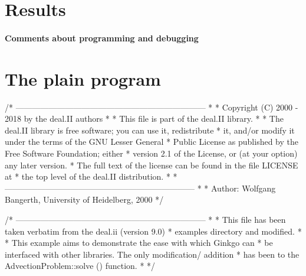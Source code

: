 \section*{Results}

\label{_Commentsaboutprogramminganddebugging}%
\paragraph*{Comments about programming and debugging }

\label{_PlainProg}%
 \section*{The plain program}


\begin{DoxyCodeInclude}
\textcolor{comment}{/* ---------------------------------------------------------------------}
\textcolor{comment}{ *}
\textcolor{comment}{ * Copyright (C) 2000 - 2018 by the deal.II authors}
\textcolor{comment}{ *}
\textcolor{comment}{ * This file is part of the deal.II library.}
\textcolor{comment}{ *}
\textcolor{comment}{ * The deal.II library is free software; you can use it, redistribute}
\textcolor{comment}{ * it, and/or modify it under the terms of the GNU Lesser General}
\textcolor{comment}{ * Public License as published by the Free Software Foundation; either}
\textcolor{comment}{ * version 2.1 of the License, or (at your option) any later version.}
\textcolor{comment}{ * The full text of the license can be found in the file LICENSE at}
\textcolor{comment}{ * the top level of the deal.II distribution.}
\textcolor{comment}{ *}
\textcolor{comment}{ * ---------------------------------------------------------------------}
\textcolor{comment}{}
\textcolor{comment}{ *}
\textcolor{comment}{ * Author: Wolfgang Bangerth, University of Heidelberg, 2000}
\textcolor{comment}{ */}

\textcolor{comment}{/* ---------------------------------------------------------------------}
\textcolor{comment}{ *}
\textcolor{comment}{ * This file has been taken verbatim from the deal.ii (version 9.0)}
\textcolor{comment}{ * examples directory and modified.}
\textcolor{comment}{ *}
\textcolor{comment}{ * This example aims to demonstrate the ease with which Ginkgo can}
\textcolor{comment}{ * be interfaced with other libraries. The only modification/ addition}
\textcolor{comment}{ * has been to the AdvectionProblem::solve () function.}
\textcolor{comment}{ *}
\textcolor{comment}{ */}


\end{DoxyCodeInclude}

